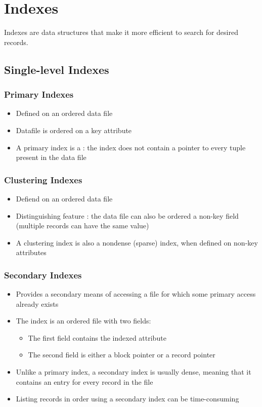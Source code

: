 \section{Indexes}

Indexes are data structures that make it more efficient to search for desired records.

\subsection{Single-level Indexes}

\subsubsection{Primary Indexes}

\begin{itemize}
    \item Defined on an ordered data file
    \item Datafile is ordered on a key attribute
    \item A primary index is a  : the index does not contain a pointer to every tuple present in the data file
\end{itemize}

\subsubsection{Clustering Indexes}

\begin{itemize}
    \item Defiend on an ordered data file
    \item Distinguishing feature : the data file can also be ordered a non-key field (multiple records can have the same value)
    \item A clustering index is also a nondense (sparse) index, when defined on non-key attributes
\end{itemize}

\subsubsection{Secondary Indexes}

\begin{itemize}
    \item Provides a secondary means of accessing a file for which some primary access already exists
    \item The index is an ordered file with two fields:
    \begin{itemize}
        \item The first field contains the indexed attribute
        \item The second field is either a block pointer or a record pointer
    \end{itemize}
    \item Unlike a primary index, a secondary index is usually dense, meaning that it contains an entry for every record in the file
    \item Listing records in order using a secondary index can be time-consuming
\end{itemize}


